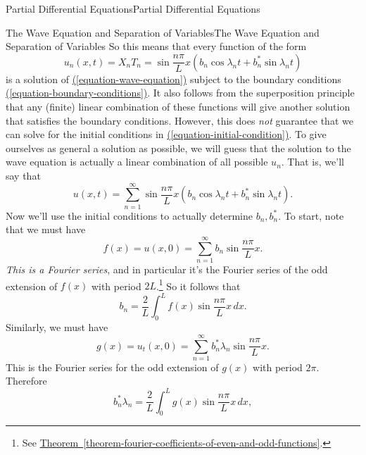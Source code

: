 \documentclass[10pt,]{book}
\numberwithin{equation}{section}
\begin{document}
\begin{chapterptx}{Partial Differential Equations}{}{Partial Differential Equations}{}{}
\begin{sectionptx}{The Wave Equation and Separation of Variables}{}{The Wave Equation and Separation of Variables}{}{}
\hypertarget{p-465}{}%
So this means that every function of the form%
%
\begin{equation*}
u_{n}(x,t) = X_{n}T_{n} = \sin\frac{n\pi}{L}x\left(b_{n}\cos\lambda_{n}t+b^{*}_{n}\sin\lambda_{n}t\right)
\end{equation*}
\hypertarget{p-466}{}%
is a solution of \hyperref[equation-wave-equation]{(\ref{equation-wave-equation})} subject to the boundary conditions \hyperref[equation-boundary-conditions]{(\ref{equation-boundary-conditions})}. It also follows from the superposition principle that any (finite) linear combination of these functions will give another solution that satisfies the boundary conditions. However, this does \emph{not} guarantee that we can solve for the initial conditions in \hyperref[equation-initial-condition]{(\ref{equation-initial-condition})}. To give ourselves as general a solution as possible, we will guess that the solution to the wave equation is actually a linear combination of all possible \(u_{n}\). That is, we'll say that%
%
\begin{equation*}
u(x,t) = \sum_{n=1}^{\infty}\sin\frac{n\pi}{L}x\left(b_{n}\cos\lambda_{n}t+b^{*}_{n}\sin\lambda_{n}t\right).
\end{equation*}
\hypertarget{p-467}{}%
Now we'll use the initial conditions to actually determine \(b_{n},b^{*}_{n}\). To start, note that we must have%
%
\begin{equation*}
f(x) = u(x,0) = \sum_{n=1}^{\infty}b_{n}\sin\frac{n\pi}{L}x.
\end{equation*}
\hypertarget{p-468}{}%
\emph{This is a Fourier series}, and in particular it's the Fourier series of the odd extension of \(f(x)\) with period \(2L\).\footnote{See \hyperref[theorem-fourier-coefficients-of-even-and-odd-functions]{Theorem~\ref{theorem-fourier-coefficients-of-even-and-odd-functions}}.\label{fn-8}} So it follows that%
%
\begin{equation*}
b_{n} = \frac{2}{L}\int_{0}^{L}f(x)\sin\frac{n\pi}{L}x\,dx.
\end{equation*}
\hypertarget{p-469}{}%
Similarly, we must have%
%
\begin{equation*}
g(x) = u_{t}(x,0) = \sum_{n=1}^{\infty}b_{n}^{*}\lambda_{n}\sin\frac{n\pi}{L}x.
\end{equation*}
\hypertarget{p-470}{}%
This is the Fourier series for the odd extension of \(g(x)\) with period \(2\pi\). Therefore%
%
\begin{equation*}
b^{*}_{n}\lambda_{n} = \frac{2}{L}\int_{0}^{L}g(x)\sin\frac{n\pi}{L}x\,dx,
\end{equation*}

\end{sectionptx}
\end{chapterptx}
\end{document}
